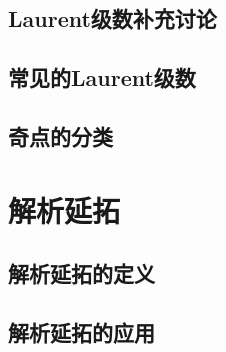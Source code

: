 \documentclass[12pt, a4paper]{ctexbook}
\begin{document}
            \subsection{Laurent级数补充讨论}

            \subsection{常见的Laurent级数}

            \subsection{奇点的分类}


        \section{解析延拓}

            \subsection{解析延拓的定义}

            \subsection{解析延拓的应用}
\end{document}
